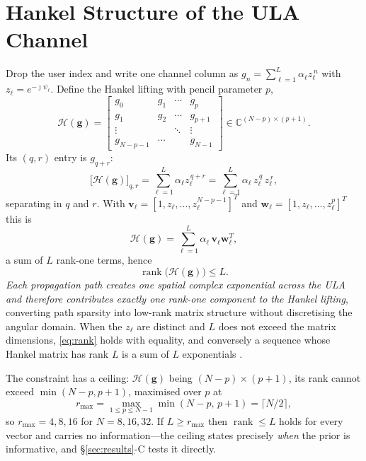 \documentclass[conference]{IEEEtran}
\DeclareMathOperator{\rank}{rank}
\newcommand{\bg}{\mathbf{g}}
\newcommand{\bv}{\mathbf{v}}
\newcommand{\bw}{\mathbf{w}}
\newcommand{\Hank}{\mathcal{H}}
\begin{document}
\section{Hankel Structure of the ULA Channel}\label{sec:hankel}
Drop the user index and write one channel column as
$g_n=\sum_{\ell=1}^{L}\alpha_\ell z_\ell^{\,n}$ with
$z_\ell=e^{-\jmath\psi_\ell}$. Define the Hankel lifting with pencil parameter
$p$,
\begin{equation}\label{eq:lift}
\Hank(\bg)=
\begin{bmatrix}
g_0 & g_1 & \cdots & g_{p}\\g_1 & g_2 & \cdots & g_{p+1}\\
\vdots & & \ddots & \vdots\\g_{N-p-1} & \cdots & & g_{N-1}
\end{bmatrix}
\in\mathbb{C}^{(N-p)\times(p+1)} .
\end{equation}
Its $(q,r)$ entry is $g_{q+r}$:
\begin{equation}\label{eq:sep}
\bigl[\Hank(\bg)\bigr]_{q,r}=\sum_{\ell=1}^{L}\alpha_\ell z_\ell^{\,q+r}
=\sum_{\ell=1}^{L}\alpha_\ell\,z_\ell^{\,q}\,z_\ell^{\,r},
\end{equation}
separating in $q$ and $r$. With $\bv_\ell=[1,z_\ell,\dots,z_\ell^{N-p-1}]^{T}$
and $\bw_\ell=[1,z_\ell,\dots,z_\ell^{p}]^{T}$ this is
\begin{equation}\label{eq:rank1}
\Hank(\bg)=\sum_{\ell=1}^{L}\alpha_\ell\,\bv_\ell\bw_\ell^{T},
\end{equation}
a sum of $L$ rank-one terms, hence
\begin{equation}\label{eq:rank}
\boxed{\ \rank\bigl(\Hank(\bg)\bigr)\le L.\ }
\end{equation}
\emph{Each propagation path creates one spatial complex exponential across the
ULA and therefore contributes exactly one rank-one component to the Hankel
lifting}, converting path sparsity into low-rank matrix structure without
discretising the angular domain. When the $z_\ell$ are distinct and $L$ does
not exceed the matrix dimensions, \eqref{eq:rank} holds with equality, and
conversely a sequence whose Hankel matrix has rank $L$ is a sum of $L$
exponentials \cite{cadzow1988}.

The constraint has a ceiling: $\Hank(\bg)$ being $(N-p)\times(p+1)$, its rank
cannot exceed $\min(N-p,p+1)$, maximised over $p$ at
\begin{equation}\label{eq:cap}
r_{\max}=\max_{1\le p\le N-1}\min(N-p,\,p+1)=\lceil N/2\rceil ,
\end{equation}
so $r_{\max}=4,8,16$ for $N=8,16,32$. If $L\ge r_{\max}$ then $\rank\le L$
holds for every vector and carries no information---the ceiling states
precisely \emph{when} the prior is informative, and \S\ref{sec:results}-C
tests it directly.
\end{document}
